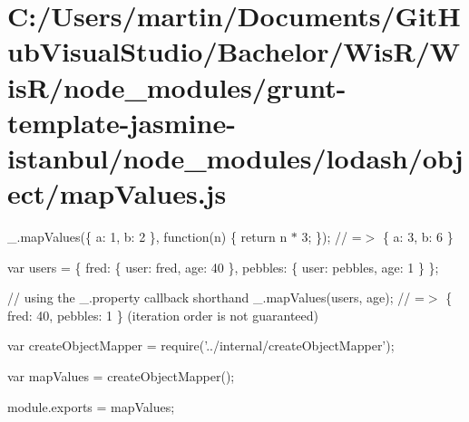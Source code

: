 \hypertarget{_c_1_2_users_2martin_2_documents_2_git_hub_visual_studio_2_bachelor_2_wis_r_2_wis_r_2node_module39e3e83072f255408612af36373d234f}{}\section{C\+:/\+Users/martin/\+Documents/\+Git\+Hub\+Visual\+Studio/\+Bachelor/\+Wis\+R/\+Wis\+R/node\+\_\+modules/grunt-\/template-\/jasmine-\/istanbul/node\+\_\+modules/lodash/object/map\+Values.\+js}
\+\_\+.\+map\+Values(\{ \textquotesingle{}a\textquotesingle{}\+: 1, \textquotesingle{}b\textquotesingle{}\+: 2 \}, function(n) \{ return n $\ast$ 3; \}); // =$>$ \{ \textquotesingle{}a\textquotesingle{}\+: 3, \textquotesingle{}b\textquotesingle{}\+: 6 \}

var users = \{ \textquotesingle{}fred\textquotesingle{}\+: \{ \textquotesingle{}user\textquotesingle{}\+: \textquotesingle{}fred\textquotesingle{}, \textquotesingle{}age\textquotesingle{}\+: 40 \}, \textquotesingle{}pebbles\textquotesingle{}\+: \{ \textquotesingle{}user\textquotesingle{}\+: \textquotesingle{}pebbles\textquotesingle{}, \textquotesingle{}age\textquotesingle{}\+: 1 \} \};

// using the {\ttfamily \+\_\+.\+property} callback shorthand \+\_\+.\+map\+Values(users, \textquotesingle{}age\textquotesingle{}); // =$>$ \{ \textquotesingle{}fred\textquotesingle{}\+: 40, \textquotesingle{}pebbles\textquotesingle{}\+: 1 \} (iteration order is not guaranteed)


\begin{DoxyCodeInclude}
var createObjectMapper = require(\textcolor{stringliteral}{'../internal/createObjectMapper'});

var mapValues = createObjectMapper();

module.exports = mapValues;
\end{DoxyCodeInclude}
 